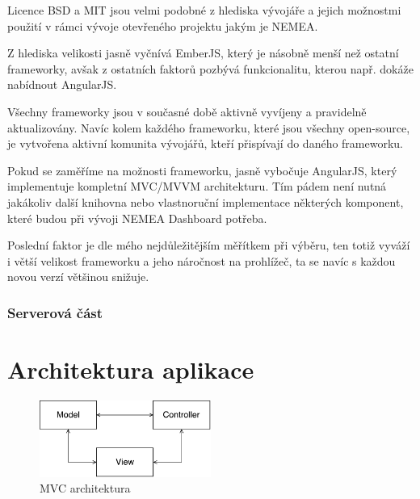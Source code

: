 
Licence BSD a MIT jsou velmi podobné z hlediska vývojáře a jejich možnostmi použití v rámci vývoje otevřeného projektu jakým je NEMEA.

Z hlediska velikosti jasně vyčnívá EmberJS, který je násobně menší než ostatní frameworky, avšak z ostatních faktorů pozbývá funkcionalitu, kterou např. dokáže nabídnout AngularJS.

Všechny frameworky jsou v současné době aktivně vyvíjeny a pravidelně aktualizovány. Navíc kolem každého frameworku, které jsou všechny open-source, je vytvořena aktivní komunita vývojářů, kteří přispívají do daného frameworku.

Pokud se zaměříme na možnosti frameworku, jasně vybočuje AngularJS, který implementuje kompletní MVC/MVVM architekturu. Tím pádem není nutná jakákoliv další knihovna nebo vlastnoruční implementace některých komponent, které budou při vývoji NEMEA Dashboard potřeba.

Poslední faktor je dle mého nejdůležitějším měřítkem při výběru, ten totiž vyváží i větší velikost frameworku a jeho náročnost na prohlížeč, ta se navíc s každou novou verzí většinou snižuje.

\subsection{Serverová část}


\chapter{Architektura aplikace}
\label{architektura}

\begin{figure}[h]
    \centering
    \includegraphics[width=0.5\textwidth]{fig/mvc.pdf}
    \caption{MVC architektura} \label{fig:mvc}
  
\end{figure}

